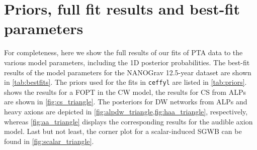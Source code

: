 \documentclass{article}
\begin{document}
\section{Priors, full fit results and best-fit parameters}
\label{app:triangle_plots}
%
For completeness, here we show the full results of our fits of PTA data to the various model parameters, including the 1D posterior probabilities.
The best-fit results of the model parameters for the NANOGrav 12.5-year dataset are shown in \cref{tab:bestfits}.
The priors used for the fits in \texttt{ceffyl} are listed in \cref{tab:priors}.
 shows the results for a FOPT in the CW model, the results for CS from ALPs are shown in \cref{fig:cs_triangle}. The posteriors for DW networks from ALPs and heavy axions are depicted in \cref{fig:alpdw_triangle,fig:haa_triangle}, respectively, whereas \cref{fig:aa_triangle} displays the corresponding results for the audible axion model.
Last but not least, the corner plot for a scalar-induced SGWB can be found in \cref{fig:scalar_triangle}.
\end{document}
